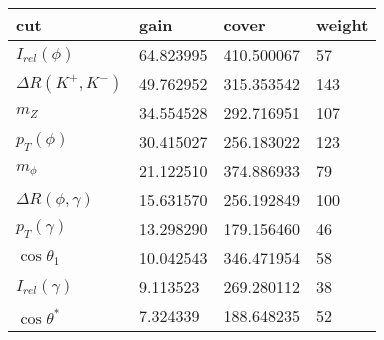 \begin{tabular}{llll}
\toprule
cut &       gain &       cover &  weight \\
\midrule
$I_{rel}(\phi)$ &  64.823995 &  410.500067 &      57 \\
$\Delta R(K^{+}, K^{-})$ &  49.762952 &  315.353542 &     143 \\
$m_{Z}$ &  34.554528 &  292.716951 &     107 \\
$p_{T}(\phi)$ &  30.415027 &  256.183022 &     123 \\
$m_{\phi}$ &  21.122510 &  374.886933 &      79 \\
$\Delta R(\phi, \gamma)$ &  15.631570 &  256.192849 &     100 \\
$p_{T}(\gamma)$ &  13.298290 &  179.156460 &      46 \\
$\cos\theta_{1}$ &  10.042543 &  346.471954 &      58 \\
$I_{rel}(\gamma)$ &   9.113523 &  269.280112 &      38 \\
$\cos\theta^{*}$ &   7.324339 &  188.648235 &      52 \\
\bottomrule
\end{tabular}
